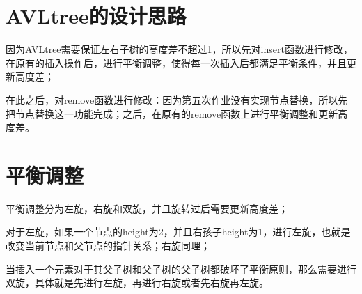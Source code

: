 \documentclass[UTF8]{ctexart}
\begin{document}
\pagestyle{fancy}
\fancyhead{}

\section{AVLtree的设计思路}
因为AVLtree需要保证左右子树的高度差不超过1，所以先对insert函数进行修改，在原有的插入操作后，进行平衡调整，使得每一次插入后都满足平衡条件，并且更新高度差；

在此之后，对remove函数进行修改：因为第五次作业没有实现节点替换，所以先把节点替换这一功能完成；之后，在原有的remove函数上进行平衡调整和更新高度差。

\section{平衡调整}


   平衡调整分为左旋，右旋和双旋，并且旋转过后需要更新高度差；
   
   对于左旋，如果一个节点的height为2，并且右孩子height为1，进行左旋，也就是改变当前节点和父节点的指针关系；右旋同理；
   
   当插入一个元素对于其父子树和父子树的父子树都破坏了平衡原则，那么需要进行双旋，具体就是先进行左旋，再进行右旋或者先右旋再左旋。   
   
\end{document}
